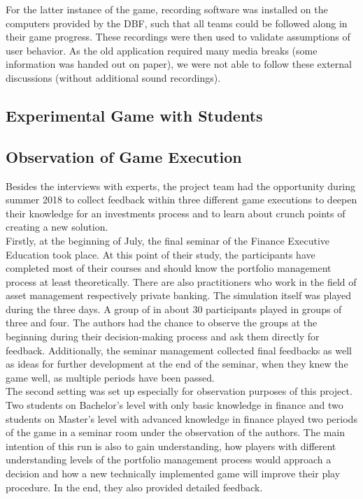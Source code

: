 For the latter instance of the game, recording software was installed on the computers provided by the DBF, such that all teams could be followed along in their game progress. These recordings were then used to validate assumptions of user behavior. As the old application required many media breaks (some information was handed out on paper), we were not able to follow these external discussions (without additional sound recordings).


\subsection{Experimental Game with Students}


\subsection{Observation of Game Execution}
Besides the interviews with experts, the project team had the opportunity during summer 2018 to collect feedback within three different game executions to deepen their knowledge for an investments process and to learn about crunch points of creating a new solution. \\

Firstly, at the beginning of July, the final seminar of the Finance Executive Education took place. At this point of their study, the participants have completed most of their courses and should know the portfolio management process at least theoretically. There are also practitioners who work in the field of asset management respectively private banking. The simulation itself was played during the three days. A group of in about 30 participants played in groups of three and four. The authors had the chance to observe the groups at the beginning during their decision-making process and ask them directly for feedback. Additionally, the seminar management collected final feedbacks as well as ideas for further development at the end of the seminar, when they knew the game well, as multiple periods have been passed. \\

The second setting was set up especially for observation purposes of this project. Two students on Bachelor’s level with only basic knowledge in finance and two students on Master’s level with advanced knowledge in finance played two periods of the game in a seminar room under the observation of the authors. The main intention of this run is also to gain understanding, how players with different understanding levels of the portfolio management process would approach a decision and how a new technically implemented game will improve their play procedure. In the end, they also provided detailed feedback. \\

